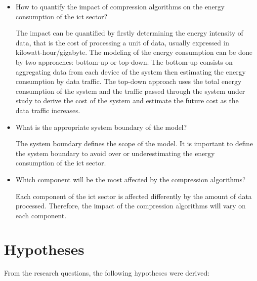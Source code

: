 \begin{itemize}
    \item How to quantify the impact of compression algorithms on the energy consumption of the \ac{ict} sector?

    The impact can be quantified by firstly determining the energy intensity of data, that is the cost of processing a unit of data, usually expressed in \ac{kilowatt-hour}/\ac{gigabyte}.
    The modeling of the energy consumption can be done by two approaches: bottom-up or top-down. 
    The bottom-up consists on aggregating data from each device of the system then estimating the energy consumption by data traffic.
    The top-down approach uses the total energy consumption of the system and the traffic passed through the system under study to derive the cost of the system and estimate the future cost as the data traffic increases.
    
    \item What is the appropriate system boundary of the model?
    
    The system boundary defines the scope of the model. It is important to define the system boundary to avoid over or underestimating the energy consumption of the \ac{ict} sector.

    \item Which component will be the most affected by the compression algorithms?

    Each component of the \ac{ict} sector is affected differently by the amount of data processed. Therefore, the impact of the compression algorithms will vary on each component.
\end{itemize}

\section{Hypotheses}
\label{section:hypotheses}

From the research questions, the following hypotheses were derived:


